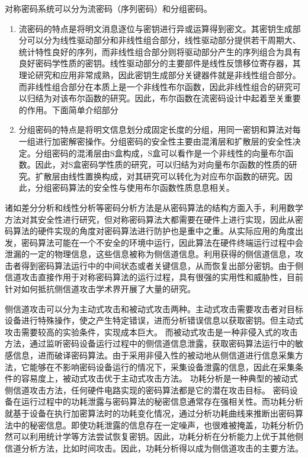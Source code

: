 \documentclass[a4paper,zihao=-4,AutoFakeBold]{ctexart}
\begin{document}
对称密码系统可以分为流密码（序列密码）和分组密码。
\begin{enumerate}[label=(\arabic{*})]
    \item 流密码的特点是将明文消息逐位与密钥进行异或运算得到密文。其密钥生成部分可以分为线性驱动部分和非线性组合部分，线性驱动部分提供若干周期大、统计特性良好的序列，而非线性组合部分则将驱动部分产生的序列组合为具有良好密码学性质的密钥。线性驱动部分的主要部件是线性反馈移位寄存器，其理论研究和应用非常成熟，因此密钥生成部分关键器件就是非线性组合部分。而非线性组合部分在本质上是一个非线性布尔函数，因此非线性组合的研究可以归结为对该布尔函数的研究。因此，布尔函数在流密码设计中起着至关重要的作用。下面简单介绍部分
    \item 分组密码的特点是将明文信息划分成固定长度的分组，用同一密钥和算法对每一组进行加密解密操作。分组密码的安全性主要由混淆层和扩散层的安全性决定。分组密码的混淆层由S盒构成，S盒可以看作是一个非线性的向量布尔函数。因此，对S盒密码学性质的研究，可以归结为对向量布尔函数的性质的研究。扩散层由线性置换构成，对其研究可以转化为对应布尔函数的研究。因此，分组密码算法的安全性与使用布尔函数性质息息相关。
\end{enumerate}

诸如差分分析和线性分析等密码分析方法是从密码算法的结构方面入手，利用数学方法对其安全性进行研究，但对称密码算法大都需要在硬件上进行实现，因此从密码算法的硬件实现的角度对密码算法进行防护也是重中之重。从实际应用的角度出发，密码算法可能在一个不安全的环境中运行，因此算法在硬件终端运行过程中会泄漏的一定的物理信息，这些信息被称为侧信道信息。利用获得的侧信道信息，攻击者得到密码算法运行中的中间状态或者关键信息，从而恢复出部分密钥。由于侧信道攻击直接作用于对称密码算法的运行过程，具有很强的实用性和威胁性，目前针对如何抵抗侧信道攻击学术界开展了大量的研究。

侧信道攻击可以分为主动式攻击和被动式攻击两种。主动式攻击需要攻击者对目标设备进行特殊操作，使之产生特定错误，进而分析错误信息以获取密钥。但主动式攻击需要较高的实验条件，实现成本巨大。
而被动式攻击是一种非侵入式的攻击方法，通过监听密码设备运行过程中的侧信道信息泄露，获取密码算法运行中的敏感信息，进而破译密码算法。由于采用非侵入性的被动地从侧信道进行信息采集方法，它能够在不影响密码设备运行的情况下，采集设备泄露的信息，因此在采集条件的容易度上，被动式攻击优于主动式攻击方法。
功耗分析是一种典型的被动式侧信道攻击方法，任何硬件电路实现的密码算法都是它的潜在攻击目标。
密码设备在运行过程中的功耗泄露与密码算法的秘密信息通常存在强相关性。而功耗分析就基于设备在执行加密算法时的功耗变化情况，通过分析功耗曲线来推断出密码算法中的秘密信息。即使功耗泄露的信息存在一定噪声，也很难被掩盖，功耗分析仍然可以利用统计学等方法尝试恢复密钥。因此，功耗分析在分析能力上优于其他侧信道分析方法，比如时间攻击。因此，功耗分析得以成为侧信道攻击的主要方法。
\end{document}
